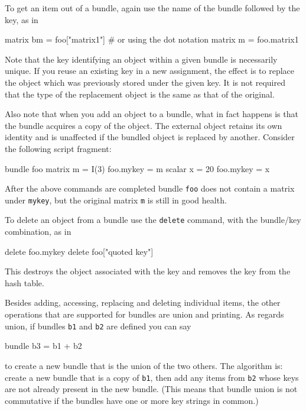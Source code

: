 To get an item out of a bundle, again use the name of the bundle
followed by the key, as in

\begin{code}
matrix bm = foo["matrix1"]
# or using the dot notation
matrix m = foo.matrix1
\end{code}

Note that the key identifying an object within a given bundle is
necessarily unique. If you reuse an existing key in a new assignment,
the effect is to replace the object which was previously stored under
the given key. It is not required that the type of the replacement
object is the same as that of the original.

Also note that when you add an object to a bundle, what in fact
happens is that the bundle acquires a copy of the object. The external
object retains its own identity and is unaffected if the bundled
object is replaced by another. Consider the following script fragment:

\begin{code}
bundle foo
matrix m = I(3)
foo.mykey = m
scalar x = 20
foo.mykey = x
\end{code}

After the above commands are completed bundle \texttt{foo} does not
contain a matrix under \texttt{mykey}, but the original matrix
\texttt{m} is still in good health.

To delete an object from a bundle use the \texttt{delete} command,
with the bundle/key combination, as in

\begin{code}
delete foo.mykey
delete foo["quoted key"]
\end{code}

This destroys the object associated with the key and removes the key
from the hash table.

Besides adding, accessing, replacing and deleting individual items,
the other operations that are supported for bundles are union and
printing. As regards union, if bundles \texttt{b1} and \texttt{b2} are
defined you can say

\begin{code}
bundle b3 = b1 + b2
\end{code}

to create a new bundle that is the union of the two others. The
algorithm is: create a new bundle that is a copy of \texttt{b1}, then
add any items from \texttt{b2} whose keys are not already present in
the new bundle. (This means that bundle union is not commutative if
the bundles have one or more key strings in common.)

